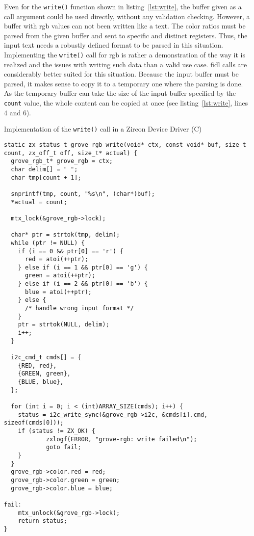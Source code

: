Even for the \texttt{write()} function shown in listing~\ref{lst:write}, the buffer given as a call argument could be used directly, without any validation checking.
However, a buffer with \ac{rgb} values can not been written like a text.
The color ratios must be parsed from the given buffer and sent to specific and distinct registers.
Thus, the input text needs a robustly defined format to be parsed in this situation.
Implementing the \texttt{write()} call for \ac{rgb} is rather a demonstration of the way it is realized and the issues with writing such data than a valid use case.
\ac{fidl} calls are considerably better suited for this situation.
Because the input buffer must be parsed, it makes sense to copy it to a temporary one where the parsing is done.
As the temporary buffer can take the size of the input buffer specified by the \texttt{count} value, the whole content can be copied at once (see listing~\ref{lst:write}, lines 4 and 6).
%
\begin{listing} [H]
    \caption{Implementation of the \texttt{write()} call in a Zircon Device Driver (C)}
\label{lst:write}
\begin{verbatim}
static zx_status_t grove_rgb_write(void* ctx, const void* buf, size_t count, zx_off_t off, size_t* actual) {
  grove_rgb_t* grove_rgb = ctx;
  char delim[] = " ";
  char tmp[count + 1];
    
  snprintf(tmp, count, "%s\n", (char*)buf);
  *actual = count;

  mtx_lock(&grove_rgb->lock);

  char* ptr = strtok(tmp, delim);
  while (ptr != NULL) {
    if (i == 0 && ptr[0] == 'r') {
      red = atoi(++ptr);
    } else if (i == 1 && ptr[0] == 'g') {
      green = atoi(++ptr);
    } else if (i == 2 && ptr[0] == 'b') {
      blue = atoi(++ptr);
    } else {
      /* handle wrong input format */
    }
    ptr = strtok(NULL, delim);
    i++;
  }

  i2c_cmd_t cmds[] = {
    {RED, red},
    {GREEN, green},
    {BLUE, blue},
  };

  for (int i = 0; i < (int)ARRAY_SIZE(cmds); i++) {
    status = i2c_write_sync(&grove_rgb->i2c, &cmds[i].cmd, sizeof(cmds[0]));
    if (status != ZX_OK) {
            zxlogf(ERROR, "grove-rgb: write failed\n");
            goto fail;
    }
  }
  grove_rgb->color.red = red;
  grove_rgb->color.green = green;
  grove_rgb->color.blue = blue;

fail:
    mtx_unlock(&grove_rgb->lock);
    return status;
}
\end{verbatim}
\end{listing}
